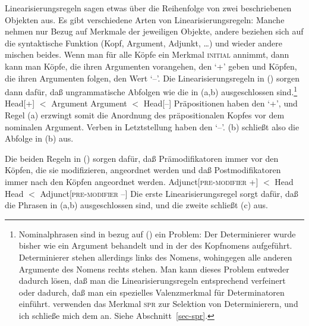 Linearisierungsregeln sagen etwas über die Reihenfolge von zwei beschriebenen Objekten aus.
Es gibt verschiedene Arten von Linearisierungsregeln: Manche nehmen nur Bezug auf Merkmale der jeweiligen
Objekte, andere beziehen sich auf die syntaktische Funktion (Kopf, Argument, Adjunkt, \ldots) und
wieder andere mischen beides.
Wenn man für alle Köpfe ein Merkmal \textsc{initial} annimmt, dann kann man Köpfe,
die ihren Argumenten vorangehen, den \initialw `+' geben und Köpfen, die ihren Argumenten folgen,
den Wert `--'. Die Linearisierungsregeln in () sorgen dann dafür, daß ungrammatische
Abfolgen wie die in (a,b) ausgeschlossen sind.\footnote{
  Nominalphrasen sind in bezug auf () ein Problem: Der Determinierer wurde bisher wie
  ein Argument behandelt und in der \subcatl des Kopfnomens aufgeführt. Determinierer stehen allerdings
  links des Nomens, wohingegen alle anderen Argumente des Nomens rechts stehen. Man kann dieses Problem
  entweder dadurch lösen, daß man die Linearisierungsregeln entsprechend verfeinert oder dadurch,
  daß man ein spezielles Valenzmerkmal für Determinatoren einführt. \citet[Abschnitt~9.4]{ps2} verwenden
  das Merkmal \textsc{spr} zur Selektion von Determinierern, und ich schließe
  mich dem an. Siehe Abschnitt~\ref{sec-spr}.%
}
\eal
\ex\label{lp-ini-arg} Head[\initial+] $<$ Argument
\ex Argument $<$ Head[\initial --]
\zl
Präpositionen haben den \initialw `+', und Regel (a) erzwingt somit die Anordnung des präpositionalen
Kopfes vor dem nominalen Argument. Verben in Letztstellung haben den \initialw `--'. (b) schließt
also die Abfolge in (b) aus.

Die beiden Regeln in () sorgen dafür, daß Prämodifikatoren immer vor den Köpfen, die sie modifizieren,
angeordnet werden und daß Postmodifikatoren immer nach den Köpfen angeordnet werden.
\eal
\label{lp-head-argument-initial}
\ex Adjunct[\textsc{pre-modifier} +] $<$ Head
\ex Head $<$ Adjunct[\textsc{pre-modifier} --]
\zl
Die erste Linearisierungsregel sorgt dafür, daß die Phrasen in (a,b) ausgeschlossen sind, und die zweite
schließt (c) aus.

